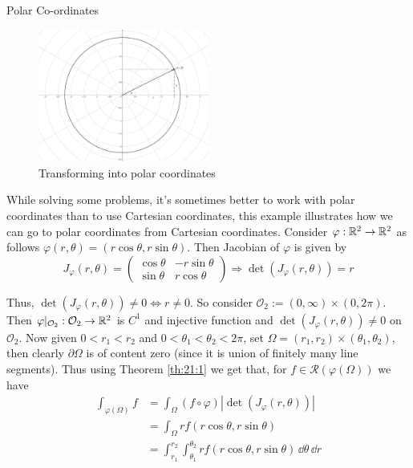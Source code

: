 \documentclass[../Analysis-3.tex]{subfiles}
\begin{document}
\begin{Eg}{Polar Co-ordinates}{}
  \begin{figure}
    \centering
    \includegraphics[width=0.5\textwidth]{../figures/lec21.1.png}
    \caption{Transforming into polar coordinates}
    \label{fig1:21}
  \end{figure}
  While solving some problems, it's sometimes better to work with polar coordinates than to use Cartesian coordinates, this example illustrates how we can go to polar coordinates from Cartesian coordinates.
  Consider $\varphi : \mathbb{R}^2 \to \mathbb{R}^2$ as follows $\varphi(r,\theta) = (r \cos\theta, r \sin\theta)$. Then Jacobian of $\varphi$ is given by
  \[
    J_{\varphi}(r,\theta) = \begin{pmatrix}
      \cos\theta & -r\sin\theta \\
      \sin\theta & r\cos\theta
    \end{pmatrix} \Rightarrow \det(J_{\varphi}(r,\theta)) = r
  \]

  Thus, $\det(J_{\varphi}(r,\theta)) \neq 0 \Leftrightarrow r \neq 0$. So consider $\mathcal{O}_2 := (0,\infty) \times (0,2\pi)$. Then $\varphi\vert_{\mathcal{O}_2} : \mathcal{O}_2 \to \mathbb{R}^2$ is $C^1$ and injective function and $\det(J_{\varphi}(r,\theta)) \neq 0 $ on $\mathcal{O}_2$. Now given $0 < r_1 < r_2$ and $0 < \theta_1 < \theta_2 < 2\pi$, set $\Omega = (r_1, r_2) \times (\theta_1, \theta_2)$, then clearly $\partial \Omega$ is of content zero (since it is union of finitely many line segments). Thus using Theorem \ref{th:21:1} we get that, for $f \in \mathscr{R}(\varphi(\Omega))$ we have
  \begin{align*}
    \int_{\varphi(\Omega)} f
     & = \int_{\Omega} (f \circ \varphi) |\det (J_{\varphi}(r,\theta))|                                 \\
     & = \int_{\Omega} r f(r\cos\theta, r\sin\theta)                                                    \\
     & = \int_{r_1}^{r_2} \int_{\theta_1}^{\theta_2} r f(r\cos\theta, r\sin\theta)\, \dd\theta \, \dd r
  \end{align*}


\end{Eg}
\end{document}
